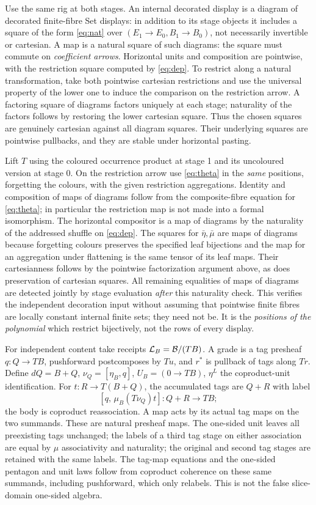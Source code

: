 \documentclass[11pt]{article}
\theoremstyle{definition}\newtheorem{definition}[theorem]{Definition}
\newcommand{\B}{\mathcal B}\newcommand{\J}{\mathcal J}
\begin{document}
Use the same rig at both stages. An internal decorated display is a
diagram of decorated finite-fibre Set displays: in addition to its
stage objects it includes a square of the form \eqref{eq:nat} over
$(E_1\to E_0,B_1\to B_0)$, not necessarily invertible or cartesian.
A map is a natural square of such diagrams: the square must commute
on \emph{coefficient arrows}. Horizontal units and composition are
pointwise, with the restriction square computed by \eqref{eq:dep}.
To restrict along a natural transformation, take both pointwise
cartesian restrictions and use the universal property of the lower
one to induce the comparison on the restriction arrow. A factoring
square of diagrams factors uniquely at each stage; naturality of
the factors follows by restoring the lower cartesian square.
Thus the chosen squares are genuinely cartesian against all diagram
squares. Their underlying squares are pointwise pullbacks, and they
are stable under horizontal pasting.

Lift $T$ using the coloured occurrence product at stage 1 and its
uncoloured version at stage 0. On the restriction arrow use
\eqref{eq:theta} in the \emph{same} positions, forgetting the
colours, with the given restriction aggregations. Identity and
composition of maps of diagrams follow from the composite-fibre
equation for \eqref{eq:theta}; in particular the restriction map
is not made into a formal isomorphism. The horizontal compositor
is a map of diagrams by the naturality of the addressed shuffle on
\eqref{eq:dep}. The squares for $\bar\eta,\bar\mu$ are maps of
diagrams because forgetting colours preserves the specified leaf
bijections and the map for an aggregation under flattening is the
same tensor of its leaf maps. Their cartesianness follows by the
pointwise factorization argument above, as does preservation of
cartesian squares. All remaining equalities of maps of diagrams
are detected jointly by stage evaluation \emph{after} this naturality
check. This verifies the independent decoration input without assuming
that pointwise finite fibres are locally constant internal finite sets;
they need not be. It is the \emph{positions of the polynomial} which
restrict bijectively, not the rows of every display.

For independent content take receipts $\Lcat_B=\B/(TB)$. A grade is a
tag presheaf $q:Q\to TB$, pushforward postcomposes by $Tu$, and
$r^*$ is pullback of tags along $Tr$. Define
$dQ=B+Q$, $\nu_Q=[\eta_B,q]$, $U_B=(0\to TB)$,
$\eta^L$ the coproduct-unit identification. For $t:R\to T(B+Q)$,
the accumulated tags are $Q+R$ with label
\[
 [q,\,\mu_B(T\nu_Q)t] : Q+R\to TB;
\]
the body is coproduct reassociation. A map acts by its actual tag
maps on the two summands. These are natural presheaf maps. The
one-sided unit leaves all preexisting tags unchanged; the labels
of a third tag stage on either association are equal by $\mu$
associativity and naturality; the original and second tag stages
are retained with the same labels. The tag-map equations and the
one-sided pentagon and unit laws follow from coproduct coherence
on these same summands, including pushforward, which only relabels.
This is not the false slice-domain one-sided algebra.
\end{document}
